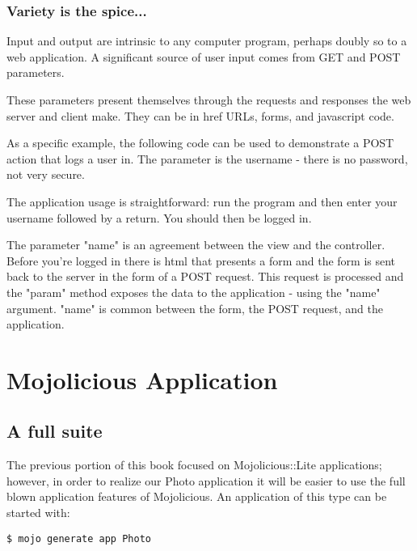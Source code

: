 \documentclass[16pt,pdftex]{book}
\begin{document}
\subsection{Variety is the spice...}

Input and output are intrinsic to any computer program, perhaps doubly so to a
web application.  A significant source of user input comes from GET and POST
parameters.

These parameters present themselves through the requests and
responses the web server and client make.  They can be in href URLs, forms, and
javascript code.

As a specific example, the following code can be used to
demonstrate a POST action that logs a user in.  The parameter is the username -
there is no password, not very secure.



The application usage is straightforward: run the program and then enter your
username followed by a return.  You should then be logged in.

The parameter "name" is an agreement between the view and the controller.
Before you're logged in there is html that presents a form and the form is sent
back to the server in the form of a POST request.  This request is processed
and the "param" method exposes the data to the application - using the "name"
argument.  "name" is common between the form, the POST request, and the
application.

\chapter*{Mojolicious Application}

\section{A full suite}

The previous portion of this book focused on Mojolicious::Lite applications;
however, in order to realize our Photo application it will be easier to use the
full blown application features of Mojolicious.  An application of this type
can be started with:

\begin{lstlisting}[style=BashInputStyle]
$ mojo generate app Photo
\end{lstlisting}
\end{document}
